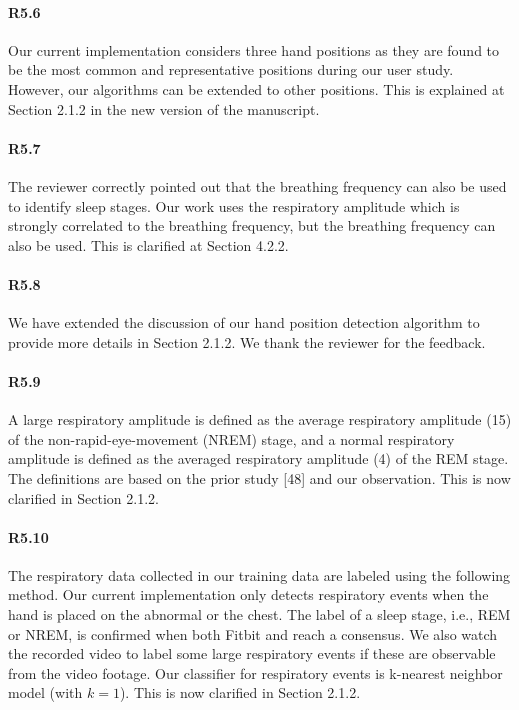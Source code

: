 \paragraph{R5.6} Our current implementation considers three hand positions as they are found to be the most common and representative
positions during our user study. However, our algorithms can be extended to other positions. This is explained at Section 2.1.2 in the new
version of the manuscript.

\paragraph{R5.7} The reviewer correctly pointed out that the breathing frequency can also be used to identify sleep stages. Our work uses
the respiratory amplitude which is strongly correlated to the breathing frequency, but the breathing frequency can also be used. This is
clarified at Section 4.2.2.

\paragraph{R5.8} We have extended the discussion of our hand position detection algorithm to provide more details in Section 2.1.2. We
thank the reviewer for the feedback.

\paragraph{R5.9} A large respiratory amplitude is defined as the average respiratory amplitude (15) of the
non-rapid-eye-movement (NREM) stage, and a normal respiratory amplitude is defined as the averaged respiratory amplitude (4) of the REM
stage. The definitions are based on the prior study [48] and our observation. This is now clarified in Section 2.1.2.


\paragraph{R5.10} The respiratory data collected in our training data are labeled using the following method. Our current implementation only detects
respiratory events when the hand is placed on the abnormal or the chest. The label of a sleep stage, i.e., REM or NREM, is confirmed when
both Fitbit and \systemname reach a consensus. We also watch the recorded video to label some large respiratory events if these are
observable from the video footage. Our classifier for respiratory events is k-nearest neighbor model (with $k=1$). This is now
clarified in Section 2.1.2.


